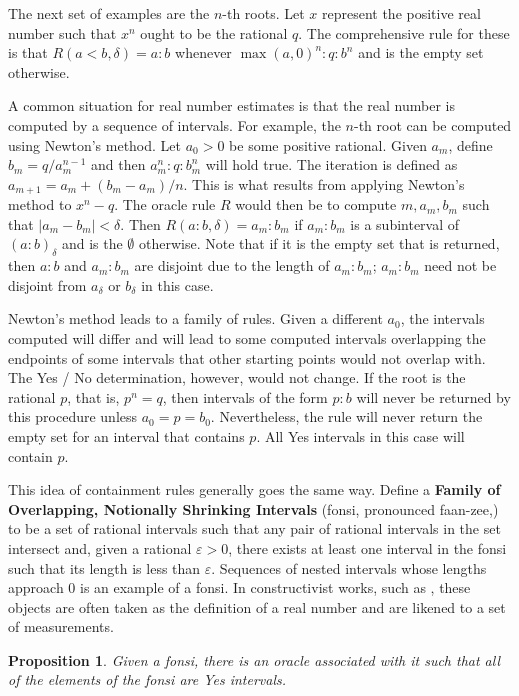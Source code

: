 \documentclass[12pt]{article}
\newtheorem{proposition}{Proposition}[section]
\begin{document}
The next set of examples are the $n$-th roots. Let $x$ represent the positive real number such that $x^n$ ought to be the rational $q$. The comprehensive rule for these is that $R(a\lt b, \delta) = a:b$ whenever $\max(a, 0)^n:q:b^n$ and is the empty set otherwise.

A common situation for real number estimates is that the real number is computed by a sequence of intervals. For example, the $n$-th root can be computed using Newton's method. Let $a_0 >0$ be some positive rational. Given $a_m$, define $b_m = q/a_m^{n-1}$ and then $a_m^n : q : b_m^n$ will hold true. The iteration is defined as $a_{m+1} = a_m + (b_m - a_m)/n$. This is what results from applying Newton's method to $x^n - q$. The oracle rule $R$ would then be to compute $m, a_m, b_m$ such that $|a_m - b_m| < \delta$.  Then $R(a:b, \delta) = a_m:b_m$ if $a_m:b_m$ is a subinterval of $(a:b)_\delta$ and is the $\emptyset$ otherwise. Note that if it is the empty set that is returned, then $a:b$ and $a_m:b_m$ are disjoint due to the length of $a_m:b_m$; $a_m:b_m$ need not be disjoint from $a_\delta$ or $b_\delta$ in this case. 

Newton's method leads to a family of rules. Given a different $a_0$, the intervals computed will differ and will lead to some computed intervals overlapping the endpoints of some intervals that other starting points would not overlap with. The Yes / No determination, however, would not  change. If the root is the rational $p$, that is, $p^n = q$,  then intervals of the form $p:b$ will never be returned by this procedure unless $a_0 = p = b_0$. Nevertheless, the rule will never return the empty set for an interval that contains $p$. All Yes intervals in this case will contain $p$. 

This idea of containment rules generally goes the same way. Define a \textbf{Family of Overlapping, Notionally Shrinking Intervals} (fonsi, pronounced faan-zee,)  to be a set of rational intervals such that any pair of rational intervals in the set intersect and, given a rational $\varepsilon >0$, there exists at least one interval in the fonsi such that its length is less than $\varepsilon$. Sequences of nested intervals whose lengths approach 0 is an example of a fonsi. In constructivist works, such as \cite{bridger}, these objects are often taken as the definition of a real number and are likened to a set of measurements. 

\begin{proposition}
    Given a fonsi, there is an oracle associated with it such that all of the elements of the fonsi are Yes intervals. 
\end{proposition}
\end{document}
